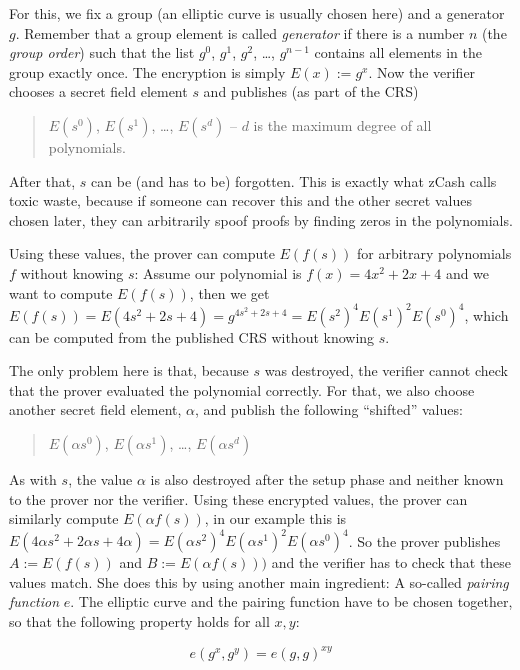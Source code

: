 \documentclass[11pt,letterpaper]{article}
\begin{document}
For this, we fix a group (an elliptic curve is usually chosen here) and a generator $g$. Remember that a group element is called \textit{generator} if there is a number $n$ (the \textit{group order}) such that the list $g^{0}$, $g^{1}$, $g^{2}$,  \dots, $g^{n-1}$ contains all elements in the group exactly once. The encryption is simply $E(x) := g^{x}$. Now the verifier chooses a secret field element $s$ and publishes (as part of the CRS)
\begin{quote}
$E(s^{0})$, $E(s^{1})$,  \dots, $E(s^{d})$ -- $d$ is the maximum degree of all polynomials.
\end{quote}


After that, $s$ can be (and has to be) forgotten. This is exactly what zCash calls toxic waste, because if someone can recover this and the other secret values chosen later, they can arbitrarily spoof proofs by finding zeros in the polynomials.


Using these values, the prover can compute $E(f(s))$ for arbitrary polynomials $f$ without knowing $s$: Assume our polynomial is $f(x) = 4x^{2} + 2x + 4$ and we want to compute $E(f(s))$, then we get $E(f(s)) = E(4s^{2} + 2s + 4) = g^{4s^2 + 2s + 4} = E(s^{2})^{4} E(s^{1})^{2} E(s^{0})^{4}$, which can be computed from the published CRS without knowing $s$.


The only problem here is that, because $s$ was destroyed, the verifier cannot check that the prover evaluated the polynomial correctly. For that, we also choose another secret field element, $\alpha$, and publish the following ``shifted'' values:
\begin{quote}
$E(\alpha s^{0})$, $E(\alpha s^{1})$,  \dots, $E(\alpha s^{d})$
\end{quote}


As with $s$, the value $\alpha$  is also destroyed after the setup phase and neither known to the prover nor the verifier. Using these encrypted values, the prover can similarly compute $E(\alpha  f(s))$, in our example this is $E(4\alpha s^{2} + 2\alpha s + 4\alpha ) = E(\alpha s^{2})^{4} E(\alpha s^{1})^{2} E(\alpha s^{0})^{4}$. So the prover publishes $A := E(f(s))$ and $B := E(\alpha  f(s)))$ and the verifier has to check that these values match. She does this by using another main ingredient: A so-called \textit{pairing function} $e$. The elliptic curve and the pairing function have to be chosen together, so that the following property holds for all $x, y$:

\[ e(g^{x}, g^{y}) = e(g, g)^{xy} \]
\end{document}
